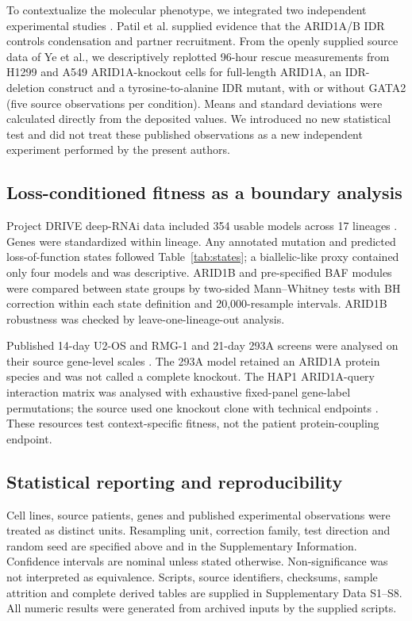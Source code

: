 \documentclass[journal=jprobs,manuscript=article,layout=traditional]{achemso}
\begin{document}
To contextualize the molecular phenotype, we integrated two independent experimental studies \citep{patil2023,ye2026}. Patil et al. supplied evidence that the ARID1A/B IDR controls condensation and partner recruitment. From the openly supplied source data of Ye et al., we descriptively replotted 96-hour rescue measurements from H1299 and A549 ARID1A-knockout cells for full-length ARID1A, an IDR-deletion construct and a tyrosine-to-alanine IDR mutant, with or without GATA2 (five source observations per condition). Means and standard deviations were calculated directly from the deposited values. We introduced no new statistical test and did not treat these published observations as a new independent experiment performed by the present authors.

\subsection{Loss-conditioned fitness as a boundary analysis}

Project DRIVE deep-RNAi data included 354 usable models across 17 lineages \citep{mcdonald2017,srivatsa2022}. Genes were standardized within lineage. Any annotated mutation and predicted loss-of-function states followed Table~\ref{tab:states}; a biallelic-like proxy contained only four models and was descriptive. ARID1B and pre-specified BAF modules were compared between state groups by two-sided Mann--Whitney tests with BH correction within each state definition and 20,000-resample intervals. ARID1B robustness was checked by leave-one-lineage-out analysis.

Published 14-day U2-OS and RMG-1 and 21-day 293A screens were analysed on their source gene-level scales \citep{awwad2025,fournier2024,feng2022}. The 293A model retained an ARID1A protein species and was not called a complete knockout. The HAP1 ARID1A-query interaction matrix was analysed with exhaustive fixed-panel gene-label permutations; the source used one knockout clone with technical endpoints \citep{billmann2026}. These resources test context-specific fitness, not the patient protein-coupling endpoint.

\subsection{Statistical reporting and reproducibility}

Cell lines, source patients, genes and published experimental observations were treated as distinct units. Resampling unit, correction family, test direction and random seed are specified above and in the Supplementary Information. Confidence intervals are nominal unless stated otherwise. Non-significance was not interpreted as equivalence. Scripts, source identifiers, checksums, sample attrition and complete derived tables are supplied in Supplementary Data S1--S8. All numeric results were generated from archived inputs by the supplied scripts.
\end{document}
